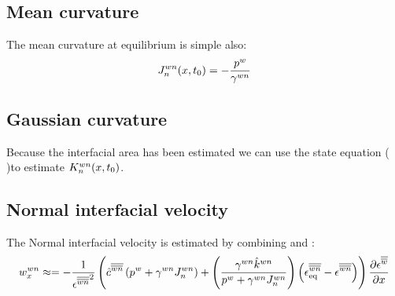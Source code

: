 \documentclass{article}
\begin{document}
\subsection{Mean curvature }
The mean curvature at equilibrium is simple also:
\begin{equation}
J_n^{wn}(x,t_0)=-\frac{{{{p_{}^{w}}}}}{{{\gamma}^{{wn}}} }  
\label{eq:Jwn_expression}
\end{equation}
\subsection{Gaussian curvature}
Because the interfacial area has been estimated we can use the state equation (  )to estimate \(K_n^{wn}(x,t_0)\).
\subsection{Normal interfacial velocity}
The Normal interfacial velocity is estimated by combining  and :
\begin{equation}
w_x^{wn}\approx=-\frac{1}{{{{\epsilon}^{{\overline{\overline{{wn}}}}}}}^2 } \left( {\hat c}^{{\overline{\overline{{wn}}}}}\left( {{{p_{}^{w}}}}+{{\gamma}^{{wn}}} J_n^{wn} \right)
+\left( \frac{{{\gamma}^{{wn}}}{{\hat{k}}}^{wn}}{{{{p_{}^{w}}}}+{{\gamma}^{{wn}}} J_n^{wn}} \right)
  \left( {{\epsilon}}^{{\overline{\overline{{wn}}}}}_{\rm{eq}}-{{{\epsilon}^{{\overline{\overline{{wn}}}}}}} \right) \right)\frac{\partial{{{{\ensuremath{\epsilon}}^{{\overline{\overline{w}}}}}}}}{\partial{x}}
\label{eq:Wx_expression}
\end{equation}
\end{document}
